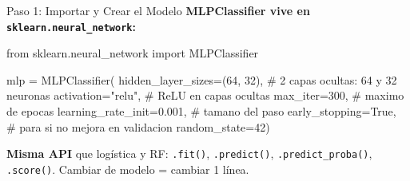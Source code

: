 \documentclass[aspectratio=169, 11pt]{beamer}
\begin{document}
\begin{frame}[fragile,shrink=10]{Paso 1: Importar y Crear el Modelo}
  \vspace{-4pt}
  {\footnotesize\color{arcaDark}\bfseries
    MLPClassifier vive en \texttt{sklearn.neural\_network}:}

  \vspace{4pt}
  \begin{pyblock}
from sklearn.neural_network import MLPClassifier

mlp = MLPClassifier(
    hidden_layer_sizes=(64, 32),   # 2 capas ocultas: 64 y 32 neuronas
    activation="relu",             # ReLU en capas ocultas
    max_iter=300,                  # maximo de epocas
    learning_rate_init=0.001,      # tamano del paso
    early_stopping=True,           # para si no mejora en validacion
    random_state=42)
  \end{pyblock}

  \vspace{4pt}
  {\scriptsize\color{arcaDark}
    \faKey\hspace{4pt} \textbf{Misma API} que log\'istica y RF:
    \texttt{.fit()}, \texttt{.predict()}, \texttt{.predict\_proba()},
    \texttt{.score()}. Cambiar de modelo = cambiar 1 l\'inea.}
\end{frame}
\end{document}
